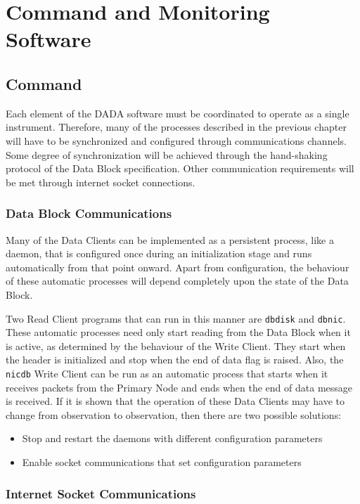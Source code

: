 \chapter{Command and Monitoring Software}

\section{Command}

Each element of the DADA software must be coordinated to operate as
a single instrument.  Therefore, many of the processes described in
the previous chapter will have to be synchronized and configured
through communications channels.  Some degree of synchronization will
be achieved through the hand-shaking protocol of the Data Block
specification.  Other communication requirements will be met through
internet socket connections.

\subsection{Data Block Communications}

Many of the Data Clients can be implemented as a persistent process,
like a daemon, that is configured once during an initialization stage
and runs automatically from that point onward.  Apart from
configuration, the behaviour of these automatic processes will depend
completely upon the state of the Data Block.

Two Read Client programs that can run in this manner are {\tt dbdisk}
and {\tt dbnic}.  These automatic processes need only start reading
from the Data Block when it is active, as determined by the behaviour
of the Write Client.  They start when the header is initialized and
stop when the end of data flag is raised.
Also, the {\tt nicdb} Write Client can be run as an automatic process
that starts when it receives packets from the Primary Node and ends
when the end of data message is received.
If it is shown that the operation of these Data Clients may have to
change from observation to observation, then there are two possible
solutions:
\begin{itemize}
\item Stop and restart the daemons with different configuration parameters
\item Enable socket communications that set configuration parameters
\end{itemize}

\subsection{Internet Socket Communications}


